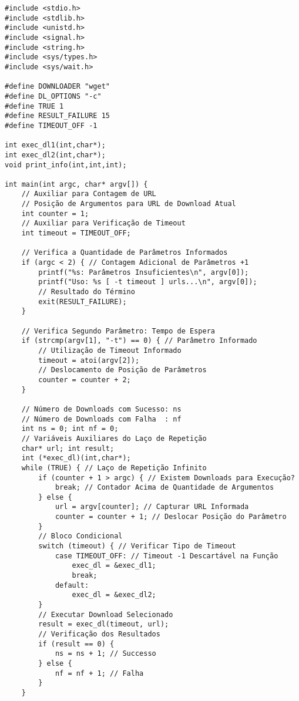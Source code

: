 \documentclass{article}
\begin{document}
\begin{small}
\begin{verbatim}
#include <stdio.h>
#include <stdlib.h>
#include <unistd.h>
#include <signal.h>
#include <string.h>
#include <sys/types.h>
#include <sys/wait.h>

#define DOWNLOADER "wget"
#define DL_OPTIONS "-c"
#define TRUE 1
#define RESULT_FAILURE 15
#define TIMEOUT_OFF -1

int exec_dl1(int,char*);
int exec_dl2(int,char*);
void print_info(int,int,int);

int main(int argc, char* argv[]) {
    // Auxiliar para Contagem de URL
    // Posição de Argumentos para URL de Download Atual
    int counter = 1;
    // Auxiliar para Verificação de Timeout
    int timeout = TIMEOUT_OFF;

    // Verifica a Quantidade de Parâmetros Informados
    if (argc < 2) { // Contagem Adicional de Parâmetros +1
        printf("%s: Parâmetros Insuficientes\n", argv[0]);
        printf("Uso: %s [ -t timeout ] urls...\n", argv[0]);
        // Resultado do Término
        exit(RESULT_FAILURE);
    }

    // Verifica Segundo Parâmetro: Tempo de Espera
    if (strcmp(argv[1], "-t") == 0) { // Parâmetro Informado
        // Utilização de Timeout Informado
        timeout = atoi(argv[2]);
        // Deslocamento de Posição de Parâmetros
        counter = counter + 2;
    }

    // Número de Downloads com Sucesso: ns
    // Número de Downloads com Falha  : nf
    int ns = 0; int nf = 0;
    // Variáveis Auxiliares do Laço de Repetição
    char* url; int result;
    int (*exec_dl)(int,char*);
    while (TRUE) { // Laço de Repetição Infinito
        if (counter + 1 > argc) { // Existem Downloads para Execução?
            break; // Contador Acima de Quantidade de Argumentos
        } else {
            url = argv[counter]; // Capturar URL Informada
            counter = counter + 1; // Deslocar Posição do Parâmetro
        }
        // Bloco Condicional
        switch (timeout) { // Verificar Tipo de Timeout
            case TIMEOUT_OFF: // Timeout -1 Descartável na Função
                exec_dl = &exec_dl1;
                break;
            default:
                exec_dl = &exec_dl2;
        }
        // Executar Download Selecionado
        result = exec_dl(timeout, url);
        // Verificação dos Resultados
        if (result == 0) {
            ns = ns + 1; // Successo
        } else {
            nf = nf + 1; // Falha
        }
    }


\end{verbatim}
\end{small}
\end{document}
